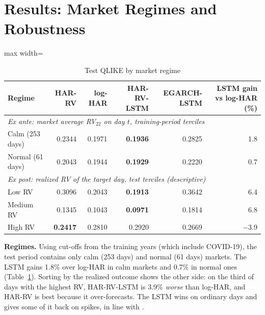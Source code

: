 \documentclass[11pt,a4paper]{article}
\let\oldsection\section
\renewcommand{\section}{\FloatBarrier\needspace{6\baselineskip}\oldsection}
\begin{document}
\section{Results: Market Regimes and Robustness}

\begin{table}[htbp]
\centering
\caption{Test QLIKE by market regime}
\label{tab:regimes}
\small
\begin{adjustbox}{max width=\textwidth}
\begin{tabular}{lrrrrr}
\toprule
Regime & HAR-RV & log-HAR & HAR-RV-LSTM & EGARCH-LSTM & LSTM gain vs log-HAR (\%) \\
\midrule
\multicolumn{6}{l}{\emph{Ex ante: market average RV$_{22}$ on day $t$, training-period terciles}}\\
Calm (253 days) & 0.2344 & 0.1971 & \textbf{0.1936} & 0.2825 & 1.8 \\
Normal (61 days) & 0.2043 & 0.1944 & \textbf{0.1929} & 0.2220 & 0.7 \\
\midrule
\multicolumn{6}{l}{\emph{Ex post: realized RV of the target day, test terciles (descriptive)}}\\
Low RV & 0.3096 & 0.2043 & \textbf{0.1913} & 0.3642 & 6.4 \\
Medium RV & 0.1345 & 0.1043 & \textbf{0.0971} & 0.1814 & 6.8 \\
High RV & \textbf{0.2417} & 0.2810 & 0.2920 & 0.2669 & $-$3.9 \\
\bottomrule
\end{tabular}
\end{adjustbox}
\end{table}


\textbf{Regimes.} Using cut-offs from the training years (which include COVID-19), the test period
contains only calm (253 days) and normal (61 days) markets. The LSTM gains 1.8\% over log-HAR in calm
markets and 0.7\% in normal ones (Table~\ref{tab:regimes}). Sorting by the realized outcome shows the
other side: on the third of days with the highest RV, HAR-RV-LSTM is 3.9\% \emph{worse} than log-HAR,
and HAR-RV is best because it over-forecasts. The LSTM wins on ordinary days and gives some of it back
on spikes, in line with \citet{rahimikia2020}.
\end{document}
